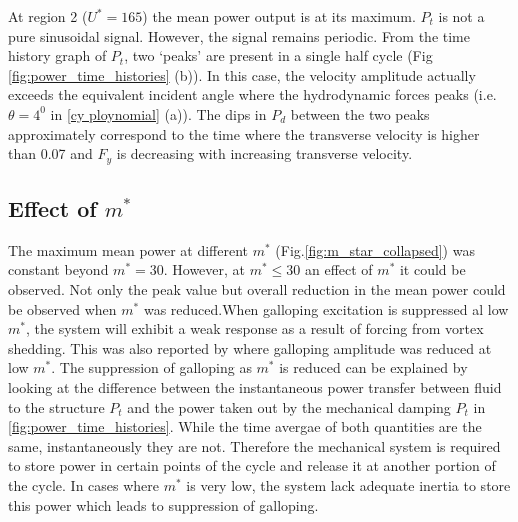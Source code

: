 At region 2 ($U^*=165$) the mean power output is at its maximum. $P_t$ is not a pure sinusoidal signal. However, the  signal remains periodic. From the time history graph of $P_t$, two `peaks' are present in a single half cycle (Fig \ref{fig:power_time_histories} (b)). In this case, the velocity amplitude actually exceeds the equivalent incident angle where the hydrodynamic forces peaks (i.e. $\theta=4^0$ in \ref{cy ploynomial} (a)). The dips in $P_d$ between the two peaks approximately correspond to the time where the transverse velocity is higher than 0.07 and $F_y$ is decreasing with increasing transverse velocity.   


 
  

 



\subsection{Effect of $m^*$}

 

The maximum mean power at different $m^*$ (Fig.\ref{fig:m_star_collapsed}) was constant beyond $m^*=30$. However, at $m^* \leq 30$ an effect of $m^*$ it could be observed. Not only the peak value but overall reduction in the mean power could be observed when $m^*$ was reduced.When galloping excitation is suppressed al low $m^*$, the system will exhibit a weak response as a result of forcing from vortex shedding. This was also reported by \cite{Joly2012} where galloping amplitude was reduced at low $m^*$. The suppression of galloping as $m^*$ is reduced can be explained by looking at the difference between the instantaneous power transfer between fluid to the structure $P_t$ and the power taken out by the mechanical damping $P_t$ in \ref{fig:power_time_histories}. While the time avergae of both quantities are the same, instantaneously they are not. Therefore the mechanical system is required to store power in certain points of the cycle and release it at another portion of the cycle. In cases where $m^*$ is very low, the system lack adequate inertia to store this power which leads to suppression of galloping. 

 

